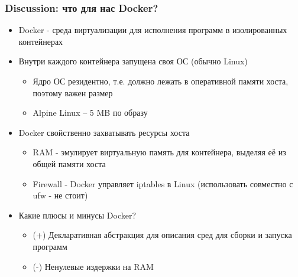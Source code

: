 \documentclass{beamer}
\begin{document}
\begin{frame}
\frametitle{Discussion: что для нас Docker?}

\begin{itemize}
	\item Docker - среда виртуализации для исполнения программ в изолированных контейнерах
	\item Внутри каждого контейнера запущена своя ОС (обычно Linux)
	\begin{itemize}
    \item Ядро ОС резидентно, т.е. должно лежать в оперативной памяти хоста, поэтому важен размер
    \item Alpine Linux – 5 MB по образу
  \end{itemize}
	\item Docker свойственно захватывать ресурсы хоста
  \begin{itemize}
    \item RAM - эмулирует виртуальную память для контейнера, выделяя её из общей памяти хоста
    \item Firewall - Docker управляет iptables в Linux (использовать совместно с ufw - не стоит)
  \end{itemize}
  \item Какие плюсы и минусы Docker?
  \begin{itemize}
    \item (+) Декларативная абстракция для описания сред для сборки и запуска программ
    \item (-) Ненулевые издержки на RAM
  \end{itemize}
\end{itemize}

\end{frame}
\end{document}
